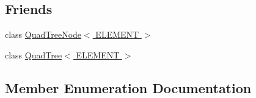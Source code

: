 \subsection*{Friends}
\begin{DoxyCompactItemize}
\item 
class \hyperlink{class_quad_tree_node_a42ad03a54be234f0ebf6bd031089c66d}{Quad\+Tree\+Node$<$ E\+L\+E\+M\+E\+N\+T $>$}
\item 
class \hyperlink{class_quad_tree_node_ae50602bd8029b62956aa40b0f5526a49}{Quad\+Tree$<$ E\+L\+E\+M\+E\+N\+T $>$}
\end{DoxyCompactItemize}


\subsection{Member Enumeration Documentation}
\hypertarget{class_quad_tree_node_a3d05d6eac38b764cdab142e22b5bebec}{}
